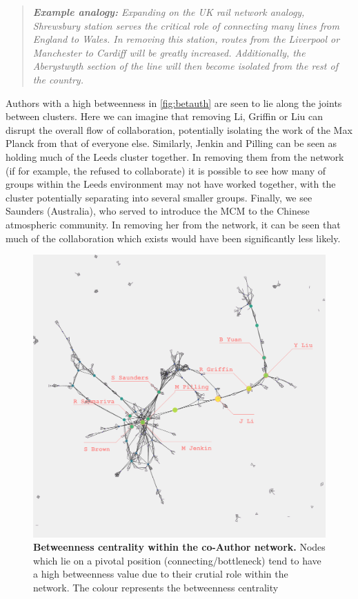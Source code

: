 \begin{quote}
\textit{
\textbf{Example analogy:} Expanding on the UK rail network analogy, Shrewsbury station serves the critical role of connecting many lines from England to Wales. In removing this station, routes from the Liverpool or Manchester to Cardiff will be greatly increased. Additionally, the Aberystwyth section of the line will then become isolated from the rest of the country.
}
\end{quote}

Authors with a high betweenness in \autoref{fig:betauth} are seen to lie along the joints between clusters. Here we can imagine that removing Li, Griffin or Liu can disrupt the overall flow of collaboration, potentially isolating the work of the Max Planck from that of everyone else. Similarly, Jenkin and Pilling can be seen as holding much of the Leeds cluster together. In removing them from the network (if for example, the refused to collaborate) it is possible to see how many of groups within the Leeds environment may not have worked together, with the cluster potentially separating into several smaller groups. Finally, we see Saunders (Australia), who served to introduce the MCM to the Chinese atmospheric community. In removing her from the network, it can be seen that much of the collaboration which exists would have been significantly less likely.  

\begin{figure}[H]
     \centering
         \includegraphics[width=.8\textwidth]{figures_c3/betweenauthor.png}
         
        \caption{ \textbf{Betweenness centrality within the co-Author network.} Nodes which lie on a pivotal position (connecting/bottleneck) tend to have a high betweenness value due to their crutial role within the network. The colour represents the betweenness centrality}
        \label{fig:betauth}
\end{figure}


